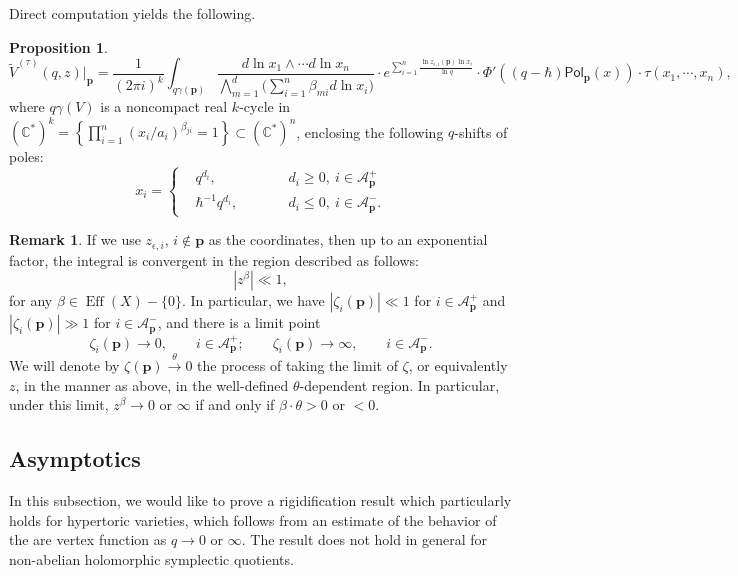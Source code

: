 \documentclass[10pt]{amsart}
\theoremstyle{definition}
\def\CC{{\mathbb{C}}}
\newcommand{\bp}{\mathbf{p}}
\newcommand{\cA}{\mathcal{A}}
\newcommand{\Eff}{\operatorname{Eff}}
\theoremstyle{definition}
\newtheorem{Remark}[Definition]{Remark}
\numberwithin{equation}{section}
\theoremstyle{Theorem}
\newtheorem{Proposition}[Definition]{Proposition}
\begin{document}
Direct computation yields the following.

\begin{Proposition}
$$
\widetilde V^{(\tau)} (q,z) \big|_\bp = \frac{1}{(2\pi i)^k} \int_{q \gamma(\bp)} \frac{d\ln x_1 \wedge \cdots d\ln x_n}{\bigwedge_{m=1}^d \Big( \sum_{i=1}^n \beta_{mi} d\ln x_i \Big) } \cdot e^{\sum_{i=1}^n \frac{\ln z_{\epsilon,i} (\bp) \ln x_i }{\ln q} } \cdot \Phi'((q - \hbar) \mathsf{Pol}_\bp (x)) \cdot \tau( x_1 , \cdots, x_n),
$$
	where $q\gamma (V)$ is a noncompact real $k$-cycle in $(\CC^*)^k = \left\{ \prod_{i=1}^n (x_i / a_i)^{\beta_{ji}} = 1 \right\} \subset (\CC^*)^n$, enclosing the following $q$-shifts of poles:
	\begin{equation} \label{poles}
	x_i = \left\{ \begin{aligned}
	& q^{d_i}, \qquad &&  d_i \geq 0, \ i \in \cA_\bp^+  \\
	& \hbar^{-1} q^{d_i}, \qquad && d_i \leq 0, \ i\in \cA_\bp^- .
	\end{aligned} \right.
	\end{equation}
\end{Proposition}

\begin{Remark} \label{limit-point}
If we use $z_{\epsilon, i}$, $i\not\in \bp$ as the coordinates, then up to an exponential factor, the integral is convergent in the region described as follows:
$$
|z^\beta| \ll 1,
$$
for any $\beta \in \Eff (X) - \{0\}$. In particular, we have $|\zeta_i (\bp)|\ll 1$ for $i\in \cA_\bp^+$ and $|\zeta_i (\bp)| \gg 1$ for $i\in \cA_\bp^- $, and there is a limit point
$$
\zeta_i (\bp) \to 0, \qquad  i \in \cA_\bp^+; \qquad \zeta_i(\bp) \to \infty , \qquad i\in \cA_\bp^-.
$$
We will denote by $\zeta (\bp) \xrightarrow{\theta} 0$ the process of taking the limit of $\zeta$, or equivalently $z$, in the manner as above, in the well-defined $\theta$-dependent region. In particular, under this limit, $z^\beta \to 0$ or $\infty$ if and only if $\beta \cdot \theta >0$ or $<0$.
\end{Remark}




\subsection{Asymptotics}

In this subsection, we would like to prove a rigidification result which particularly holds for hypertoric varieties, which follows from an estimate of the behavior of the are vertex function as $q\to 0$ or $\infty$. The result does not hold in general for non-abelian holomorphic symplectic quotients.
\end{document}
